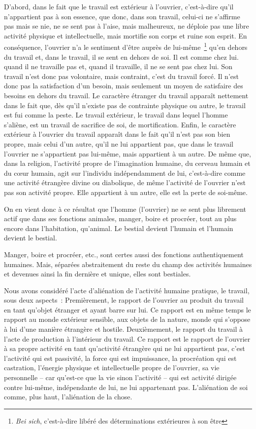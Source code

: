 \documentclass[french,twoside]{book} %
\begin{document}
D’abord, dans le fait que le travail est extérieur à l’ouvrier, c’est-à-dire qu’il n’appartient pas à son essence, que donc, dans son travail, celui-ci ne s’affirme pas mais se nie, ne se sent pas à l’aise, mais malheureux, ne déploie pas une libre activité physique et intellectuelle, mais mortifie son corps et ruine son esprit. En conséquence, l’ouvrier n’a le sentiment d’être auprès de lui-même \footnote{\emph{Bei sich}, c’est-à-dire libéré des déterminations extérieures à son être} qu’en dehors du travail et, dans le travail, il se sent en dehors de soi. Il est comme chez lui. quand il ne travaille pas et, quand il travaille, il ne se sent pas chez lui. Son travail n’est donc pas volontaire, mais contraint, c’est du travail forcé. Il n’est donc pas la satisfaction d’un besoin, mais seulement un moyen de satisfaire des besoins en dehors du travail. Le caractère étranger du travail apparaît nettement dans le fait que, dès qu’il n’existe pas de contrainte physique ou autre, le travail est fui comme la peste. Le travail extérieur, le travail dans lequel l’homme s’aliène, est un travail de sacrifice de soi, de mortification. Enfin, le caractère extérieur à l’ouvrier du travail apparaît dans le fait qu’il n’est pas son bien propre, mais celui d’un autre, qu’il ne lui appartient pas, que dans le travail l’ouvrier ne s’appartient pas lui-même, mais appartient à un autre. De même que, dans la religion, l’activité propre de l’imagination humaine, du cerveau humain et du cœur humain, agit sur l’individu indépendamment de lui, c’est-à-dire comme une activité étrangère divine ou diabolique, de même l’activité de l’ouvrier n’est pas son activité propre. Elle appartient à un autre, elle est la perte de soi-même.\par
On en vient donc à ce résultat que l’homme (l’ouvrier) ne se sent plus librement actif que dans ses fonctions animales, manger, boire et procréer, tout au plus encore dans l’habitation, qu’animal. Le bestial devient l’humain et l’humain devient le bestial.\par
Manger, boire et procréer, etc., sont certes aussi des fonctions authentiquement humaines. Mais, séparées abstraitement du reste du champ des activités humaines et devenues ainsi la fin dernière et unique, elles sont bestiales.\par
Nous avons considéré l’acte d’aliénation de l’activité humaine pratique, le travail, sous deux aspects : Premièrement, le rapport de l’ouvrier au produit du travail en tant qu’objet étranger et ayant barre sur lui. Ce rapport est en même temps le rapport au monde extérieur sensible, aux objets de la nature, monde qui s’oppose à lui d’une manière étrangère et hostile. Deuxièmement, le rapport du travail à l’acte de production à l’intérieur du travail. Ce rapport est le rapport de l’ouvrier à sa propre activité en tant qu’activité étrangère qui ne lui appartient pas, c’est l’activité qui est passivité, la force qui est impuissance, la procréation qui est castration, l’énergie physique et intellectuelle propre de l’ouvrier, sa vie personnelle – car qu’est-ce que la vie sinon l’activité – qui est activité dirigée contre lui-même, indépendante de lui, ne lui appartenant pas. L’aliénation de soi comme, plus haut, l’aliénation de la chose.\par
\end{document}
